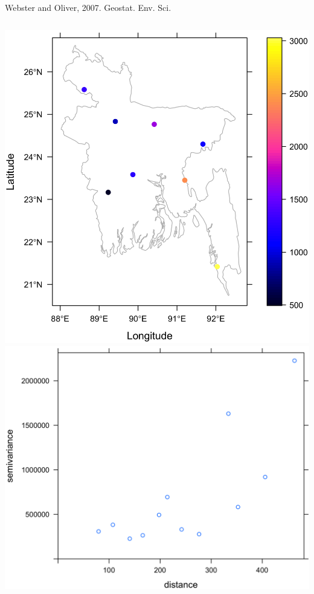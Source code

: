 \documentclass[10pt, compress]{beamer}
\begin{document}
\begin{frame}
{\begin{columns}
    \end{columns}\\
  \hspace{5cm} \footnotesize Webster and Oliver, 2007. Geostat. Env. Sci.}
  {\begin{columns}
  \column{5cm}
    \centering
    \includegraphics[width=1.15\textwidth]{images/SSTP2.png}
    \column{5cm}
    \centering
    \includegraphics[width=1.15\textwidth]{images/SSTP3.png}

\end{columns}}
\end{frame}
\end{document}
